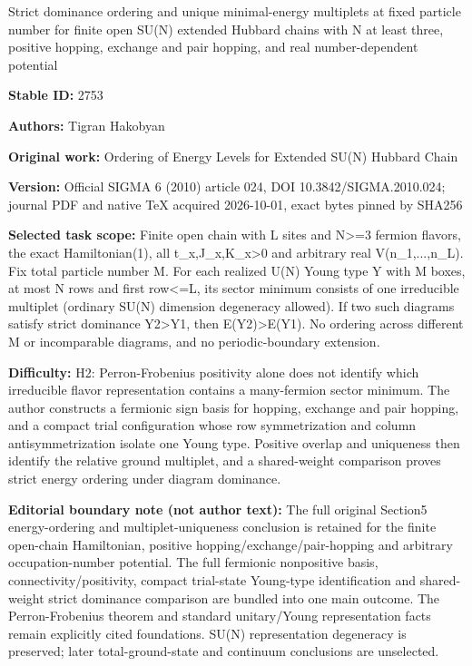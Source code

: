 \documentclass[11pt]{article}
\begin{document}
\begin{center}\Large Strict dominance ordering and unique minimal-energy multiplets at fixed particle number for finite open SU(N) extended Hubbard chains with N at least three, positive hopping, exchange and pair hopping, and real number-dependent potential\end{center}
\noindent\textbf{Stable ID:} 2753\par
\noindent\textbf{Authors:} Tigran Hakobyan\par
\noindent\textbf{Original work:} Ordering of Energy Levels for Extended SU(N) Hubbard Chain\par
\noindent\textbf{Version:} Official SIGMA 6 (2010) article 024, DOI 10.3842/SIGMA.2010.024; journal PDF and native TeX acquired 2026-10-01, exact bytes pinned by SHA256\par
\noindent\textbf{Selected task scope:} Finite open chain with L sites and N>=\allowbreak{}3 fermion flavors, the exact Hamiltonian(1), all t\_x,J\_x,K\_x>0 and arbitrary real V(n\_1,...,n\_L). Fix total particle number M. For each realized U(N) Young type Y with M boxes, at most N rows and first row<=\allowbreak{}L, its sector minimum consists of one irreducible multiplet (ordinary SU(N) dimension degeneracy allowed). If two such diagrams satisfy strict dominance Y2>Y1, then E(Y2)>E(Y1). No ordering across different M or incomparable diagrams, and no periodic-boundary extension.\par
\noindent\textbf{Difficulty:} H2: Perron-Frobenius positivity alone does not identify which irreducible flavor representation contains a many-fermion sector minimum. The author constructs a fermionic sign basis for hopping, exchange and pair hopping, and a compact trial configuration whose row symmetrization and column antisymmetrization isolate one Young type. Positive overlap and uniqueness then identify the relative ground multiplet, and a shared-weight comparison proves strict energy ordering under diagram dominance.\par
\noindent\textbf{Editorial boundary note (not author text):} The full original Section5 energy-ordering and multiplet-uniqueness conclusion is retained for the finite open-chain Hamiltonian, positive hopping/exchange/pair-hopping and arbitrary occupation-number potential. The full fermionic nonpositive basis, connectivity/positivity, compact trial-state Young-type identification and shared-weight strict dominance comparison are bundled into one main outcome. The Perron-Frobenius theorem and standard unitary/Young representation facts remain explicitly cited foundations. SU(N) representation degeneracy is preserved; later total-ground-state and continuum conclusions are unselected.\par
\end{document}
